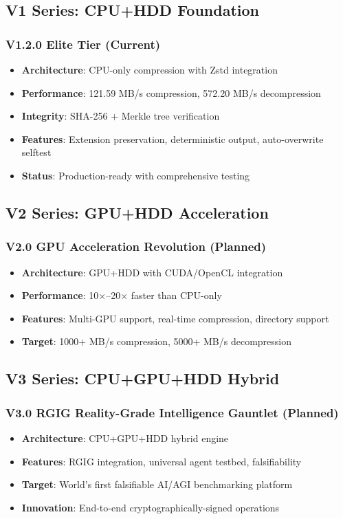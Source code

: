 \documentclass[12pt,a4paper]{article}
\begin{document}
\subsection{V1 Series: CPU+HDD Foundation}
\subsubsection{V1.2.0 Elite Tier (Current)}
\begin{itemize}
    \item \textbf{Architecture}: CPU-only compression with Zstd integration
    \item \textbf{Performance}: 121.59 MB/s compression, 572.20 MB/s decompression
    \item \textbf{Integrity}: SHA-256 + Merkle tree verification
    \item \textbf{Features}: Extension preservation, deterministic output, auto-overwrite selftest
    \item \textbf{Status}: Production-ready with comprehensive testing
\end{itemize}

\subsection{V2 Series: GPU+HDD Acceleration}
\subsubsection{V2.0 GPU Acceleration Revolution (Planned)}
\begin{itemize}
    \item \textbf{Architecture}: GPU+HDD with CUDA/OpenCL integration
    \item \textbf{Performance}: 10×–20× faster than CPU-only
    \item \textbf{Features}: Multi-GPU support, real-time compression, directory support
    \item \textbf{Target}: 1000+ MB/s compression, 5000+ MB/s decompression
\end{itemize}

\subsection{V3 Series: CPU+GPU+HDD Hybrid}
\subsubsection{V3.0 RGIG Reality-Grade Intelligence Gauntlet (Planned)}
\begin{itemize}
    \item \textbf{Architecture}: CPU+GPU+HDD hybrid engine
    \item \textbf{Features}: RGIG integration, universal agent testbed, falsifiability
    \item \textbf{Target}: World's first falsifiable AI/AGI benchmarking platform
    \item \textbf{Innovation}: End-to-end cryptographically-signed operations
\end{itemize}
\end{document}
